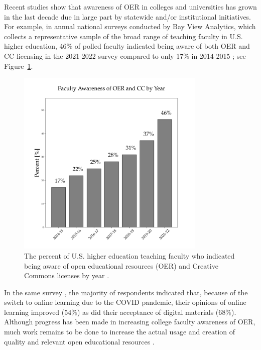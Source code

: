 \documentclass[11pt]{article}
\begin{document}
Recent studies show that awareness of OER in colleges and universities has grown in the last decade due in large part by statewide and/or institutional initiatives.  For example, in annual national surveys conducted by Bay View Analytics, which collects a representative sample of the broad range of teaching faculty in U.S. higher education, 46\% of polled faculty indicated being aware of both OER and CC licensing in the 2021-2022 survey compared to only 17\% in 2014-2015 \cite{JS-JS:2022}; see Figure~\ref{fig:oer-awareness}.
\begin{figure}
\centering
\includegraphics[width=90mm]{oer_awareness.png}
\caption{The percent of U.S. higher education teaching faculty who indicated being aware of open educational resources (OER) and Creative Commons licenses by year \cite{JS-JS:2022}.}
\label{fig:oer-awareness}
\end{figure}
In the same survey \cite{JS-JS:2022}, the majority of respondents indicated that, because of the switch to online learning due to the COVID pandemic, their opinions of online learning improved (54\%) as did their acceptance of digital materials (68\%).  Although progress has been made in increasing college faculty awareness of OER, much work remains to be done to increase the actual usage and creation of quality and relevant open educational resources \cite{flvc2022}.
\end{document}
